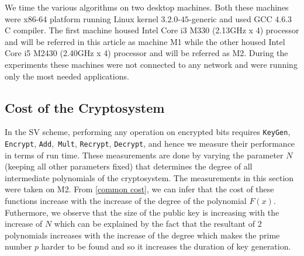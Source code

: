 \documentclass{acm_proc_article-sp}
\begin{document}
We time the various algorithms on two desktop machines. Both these machines were x86-64 platform running Linux kernel $3.2.0$-$45$-generic  and used GCC $4.6.3$ C compiler.  The first machine housed Intel Core i3 M330 (2.13GHz x 4) processor and will be referred in this article as machine M1 while the other housed Intel Core i5 M2430 (2.40GHz x 4) processor and will be referred as M2. During the experiments these machines were not connected to any network and were running only the most needed applications.
 
\subsection{Cost of the Cryptosystem}
 In the SV scheme, performing any operation on encrypted bits requires  \texttt{KeyGen}, \texttt{Encrypt}, \texttt{Add},\texttt{ Mult}, \texttt{Recrypt}, \texttt{Decrypt}, and hence we measure their performance in terms of run time. These measurements are done by varying the parameter $N$(keeping all other parameters fixed) that determines the degree of all intermediate polynomials of the cryptosystem. The measurements in this section were taken on M2. From \autoref{common cost}, we can infer that the cost of these functions increase with the increase of the degree of the polynomial $F(x)$. Futhermore, we observe that the size of the public key is increasing with the increase of $N$ which can be explained by the fact that the resultant of 2 polynomials increases with the increase of the degree which makes the prime number $p$ harder to be found and so it increases the duration of key generation.

\begin{table}[htb]
  \centering
  \caption{Run time (ms)}
\end{table}
\end{document}
